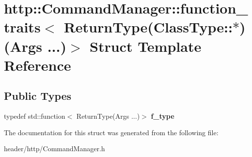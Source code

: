 \hypertarget{structhttp_1_1_command_manager_1_1function__traits_3_01_return_type_07_class_type_1_1_5_08_07_args_01_8_8_8_08_4}{}\section{http\+:\+:Command\+Manager\+:\+:function\+\_\+traits$<$ Return\+Type(Class\+Type\+:\+:$\ast$)(Args ...)$>$ Struct Template Reference}
\label{structhttp_1_1_command_manager_1_1function__traits_3_01_return_type_07_class_type_1_1_5_08_07_args_01_8_8_8_08_4}
\subsection*{Public Types}
\begin{DoxyCompactItemize}
\item 
\mbox{\label{structhttp_1_1_command_manager_1_1function__traits_3_01_return_type_07_class_type_1_1_5_08_07_args_01_8_8_8_08_4_a3dc2482901f243f2dc4ec3ad3f89e3f8}} 
typedef std\+::function$<$ Return\+Type(Args ...)$>$ {\bfseries f\+\_\+type}
\end{DoxyCompactItemize}


The documentation for this struct was generated from the following file\+:\begin{DoxyCompactItemize}
\item 
header/http/Command\+Manager.\+h\end{DoxyCompactItemize}
